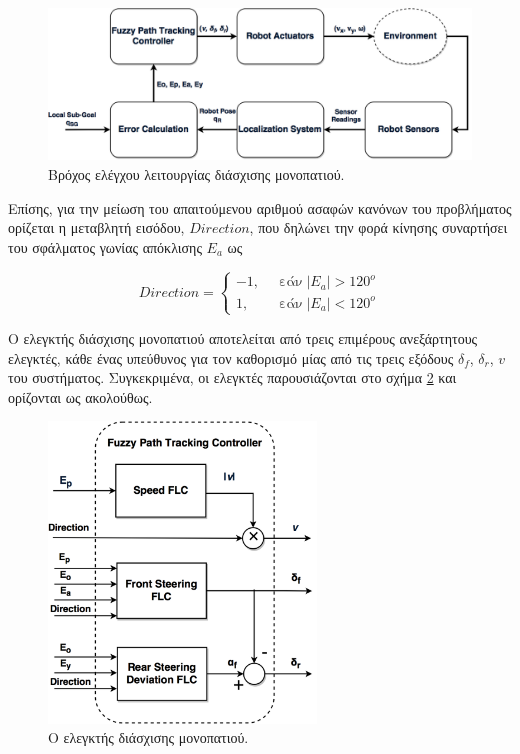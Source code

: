 \bigskip
\begin{figure}[!ht]
	\centering
	\includegraphics[width=0.8\linewidth]{Chapters/Chapter3/Figures/ptc_block_diagram.png}
	\caption{Βρόχος ελέγχου λειτουργίας διάσχισης μονοπατιού.}
	\label{fig:ptc_block_diagram}
\end{figure}

\bigskip
Επίσης, για την μείωση του απαιτούμενου αριθμού ασαφών κανόνων του προβλήματος ορίζεται η μεταβλητή εισόδου, $Direction$, που δηλώνει την φορά κίνησης συναρτήσει του σφάλματος γωνίας απόκλισης $E_a$ ως

\begin{equation}
	\textit{Direction} =
		\begin{cases}
			-1,\;\; &\text{εάν}\; |E_a| > 120^o\\
			1, \;\; &\text{εάν}\; |E_a| < 120^o
		\end{cases}
\end{equation}

\bigskip
Ο ελεγκτής διάσχισης μονοπατιού αποτελείται από τρεις επιμέρους ανεξάρτητους ελεγκτές, κάθε ένας υπεύθυνος για τον καθορισμό μίας από τις τρεις εξόδους $\delta_f$, $\delta_r$, $v$ του συστήματος. Συγκεκριμένα, οι ελεγκτές παρουσιάζονται στο σχήμα \ref{fig:fuzzy_ptc_inside} και ορίζονται ως ακολούθως.


\begin{figure}[!ht]
	\centering
	\includegraphics[height=8cm]{Chapters/Chapter3/Figures/fuzzy_ptc_inside.png}
	\caption{Ο ελεγκτής διάσχισης μονοπατιού.}
	\label{fig:fuzzy_ptc_inside}
\end{figure}

